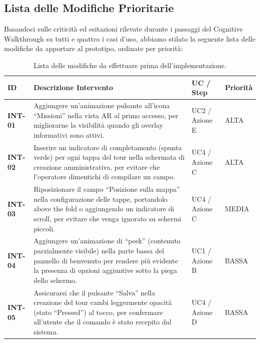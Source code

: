 \subsection{Lista delle Modifiche Prioritarie}

Basandoci sulle criticità ed esitazioni rilevate durante i passaggi del Cognitive Walkthrough su tutti e quattro i casi d'uso, abbiamo stilato la seguente lista delle modifiche da apportare al prototipo, ordinate per priorità:

\begin{table}[H]
    \centering
    \small
    \renewcommand{\arraystretch}{1.3}
    \begin{tabular}{
        p{1.5cm}
        |>{\raggedright\arraybackslash}p{6cm}
        |>{\centering\arraybackslash}p{2.5cm}
        |>{\centering\arraybackslash}p{2.5cm}
    }
    \toprule
    \rowcolor{culturiaRed}
    \textcolor{culturiaWhite}{\textbf{ID}} &
    \textcolor{culturiaWhite}{\textbf{Descrizione Intervento}} &
    \textcolor{culturiaWhite}{\textbf{UC / Step}} &
    \textcolor{culturiaWhite}{\textbf{Priorità}} \\
    \midrule
    \rowcolor{culturiaBeige}
    \textbf{INT-01} & Aggiungere un'animazione pulsante all'icona ``Missioni'' nella vista AR al primo accesso, per migliorarne la visibilità quando gli overlay informativi sono attivi. & UC2 / Azione E & ALTA \\

    \textbf{INT-02} & Inserire un indicatore di completamento (spunta verde) per ogni tappa del tour nella schermata di creazione amministrativa, per evitare che l'operatore dimentichi di compilare un campo. & UC4 / Azione C & ALTA \\

    \rowcolor{culturiaBeige}
    \textbf{INT-03} & Riposizionare il campo ``Posizione sulla mappa'' nella configurazione delle tappe, portandolo above the fold o aggiungendo un indicatore di scroll, per evitare che venga ignorato su schermi piccoli. & UC4 / Azione C & MEDIA \\

    \textbf{INT-04} & Aggiungere un'animazione di ``peek'' (contenuto parzialmente visibile) nella parte bassa del pannello di benvenuto per rendere più evidente la presenza di opzioni aggiuntive sotto la piega dello schermo. & UC1 / Azione B & BASSA \\

    \rowcolor{culturiaBeige}
    \textbf{INT-05} & Assicurarsi che il pulsante ``Salva'' nella creazione del tour cambi leggermente opacità (stato ``Pressed'') al tocco, per confermare all'utente che il comando è stato recepito dal sistema. & UC4 / Azione D & BASSA \\
    \bottomrule
    \end{tabular}
    \caption{Lista delle modifiche da effettuare prima dell'implementazione.}
    \label{tab:priorita_modifiche}
\end{table}
